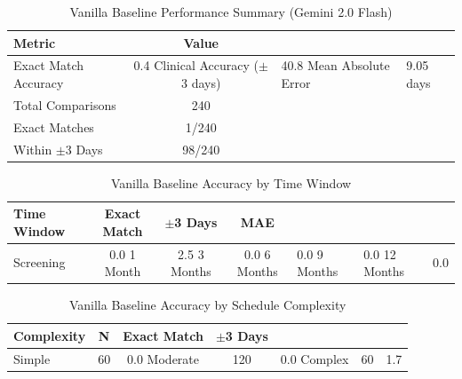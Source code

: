 
\begin{table}[htbp]
\centering
\caption{Vanilla Baseline Performance Summary (Gemini 2.0 Flash)}
\label{tab:vanilla_baseline_summary}
\begin{tabular}{lc}
\toprule
\textbf{Metric} & \textbf{Value} \\
\midrule
Exact Match Accuracy & 0.4%
Clinical Accuracy ($\pm$3 days) & 40.8%
Mean Absolute Error & 9.05 days \\
Total Comparisons & 240 \\
Exact Matches & 1/240 \\
Within $\pm$3 Days & 98/240 \\
\bottomrule
\end{tabular}
\end{table}

\begin{table}[htbp]
\centering
\caption{Vanilla Baseline Accuracy by Time Window}
\label{tab:vanilla_baseline_windows}
\begin{tabular}{lccc}
\toprule
\textbf{Time Window} & \textbf{Exact Match} & \textbf{$\pm$3 Days} & \textbf{MAE} \\
\midrule
Screening & 0.0%
1 Month & 2.5%
3 Months & 0.0%
6 Months & 0.0%
9 Months & 0.0%
12 Months & 0.0%
\bottomrule
\end{tabular}
\end{table}

\begin{table}[htbp]
\centering
\caption{Vanilla Baseline Accuracy by Schedule Complexity}
\label{tab:vanilla_baseline_complexity}
\begin{tabular}{lccc}
\toprule
\textbf{Complexity} & \textbf{N} & \textbf{Exact Match} & \textbf{$\pm$3 Days} \\
\midrule
Simple & 60 & 0.0%
Moderate & 120 & 0.0%
Complex & 60 & 1.7%
\bottomrule
\end{tabular}
\end{table}

